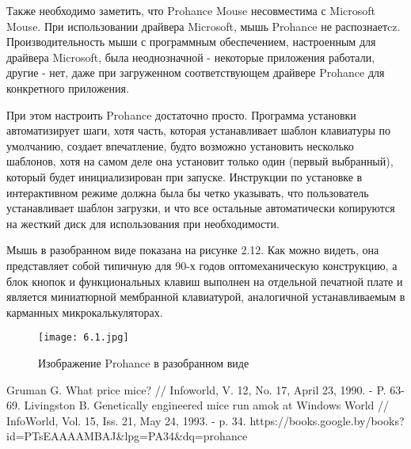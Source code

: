 \documentclass[11pt, a4paper]{article}
\begin{document}
    
    Также необходимо заметить, что Prohance Mouse несовместима с Microsoft Mouse. При использовании драйвера Microsoft, мышь Prohance не распознаетcz. Производительность мыши с программным обеспечением, настроенным для драйвера Microsoft, была неоднозначной - некоторые приложения работали, другие - нет, даже при загруженном соответствующем драйвере Prohance для конкретного приложения.

    При этом настроить Prohance достаточно просто. Программа установки автоматизирует шаги, хотя часть, которая устанавливает шаблон клавиатуры по умолчанию, создает впечатление, будто возможно установить несколько шаблонов, хотя на самом деле она установит только один (первый выбранный), который будет инициализирован при запуске. Инструкции по установке в интерактивном режиме должна была бы четко указывать, что пользователь устанавливает шаблон загрузки, и что все остальные автоматически копируются на жесткий диск для использования при необходимости.

   Мышь в разобранном виде показана на рисунке 2.12. Как можно видеть, она представляет собой типичную для 90-х годов оптомеханическую конструкцию, а блок кнопок и функциональных клавиш выполнен на отдельной печатной плате и является миниатюрной мембранной клавиатурой, аналогичной устанавливаемым в карманных микрокалькуляторах.
   
  \begin{figure}[h]
        \centering
    \texttt{[image: 6.1.jpg]}
        \label{quad-niz}
        \caption{Изображение Prohance в разобранном виде}
    \end{figure}
\begin{thebibliography}{9}
 Gruman G. What price mice? // Infoworld, V. 12, No. 17, April 23, 1990. - P. 63-69.
 Livingston B. Genetically engineered mice run amok at Windows World // InfoWorld, Vol. 15, Iss. 21, May 24, 1993. - p. 34. https://books.google.by/books?id=PTsEAAAAMBAJ&lpg=PA34&dq=prohance%
\end{thebibliography}
\end{document}
